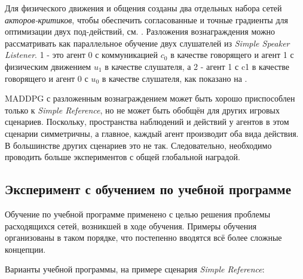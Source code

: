 Для физического движения и общения созданы два отдельных набора сетей \textit{акторов-критиков}, чтобы обеспечить согласованные и точные градиенты для оптимизации двух под-действий, см. . Разложения вознаграждения можно рассматривать как параллельное обучение двух слушателей из \textit{Simple Speaker Listener}. 1 - это агент 0 с коммуникацией $c_0$ в качестве говорящего и агент 1 с физическим движением $u_1$ в качестве слушателя, а 2 - агент 1 с c1 в качестве говорящего и агент 0 с $u_0$ в качестве слушателя, как показано на .

MADDPG с разложенным вознаграждением может быть хорошо приспособлен только к \textit{Simple Reference}, но не может быть обобщён для других игровых сценариев. Поскольку, пространства наблюдений и действий у агентов в этом сценарии симметричны, а главное, каждый агент производит оба вида действия. В большинстве других сценариев это не так. Следовательно, необходимо проводить больше экспериментов с общей глобальной наградой.

\subsection{Эксперимент с обучением по учебной программе}

Обучение по учебной программе применено с целью решения проблемы расходящихся сетей, возникшей в ходе обучения. Примеры обучения организованы в таком порядке, что постепенно вводятся всё более сложные концепции.

Варианты учебной программы, на примере сценария \textit{Simple Reference}:

